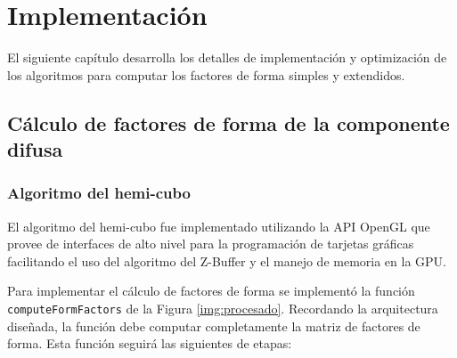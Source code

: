 \chapter{Implementación}
\label{ch:chap04}

El siguiente capítulo desarrolla los detalles de implementación y optimización de los algoritmos para computar los factores de forma simples y extendidos.

\section{Cálculo de factores de forma de la componente difusa}
\label{sec:dif-impl}

\subsection{Algoritmo del hemi-cubo}

El algoritmo del hemi-cubo fue implementado utilizando la API OpenGL que provee de interfaces de alto nivel para la programación de tarjetas gráficas facilitando el uso del algoritmo del Z-Buffer y el manejo de memoria en la GPU.

Para implementar el cálculo de factores de forma se implementó la función \verb|computeFormFactors| de la Figura \ref{img:procesado}. Recordando la arquitectura diseñada, la función debe computar completamente la matriz de factores de forma. Esta función seguirá las siguientes de etapas:

